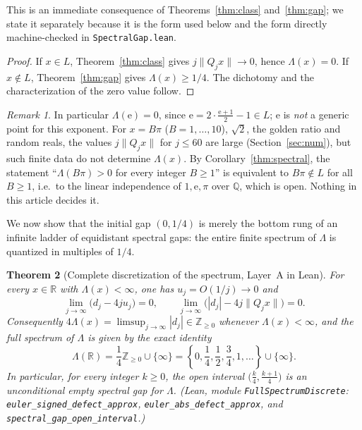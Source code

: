 \documentclass[11pt]{article}
\newtheorem{theorem}{Theorem}
\theoremstyle{definition}
\theoremstyle{remark}
\newtheorem{remark}[theorem]{Remark}
\newcommand{\R}{\mathbb{R}}
\newcommand{\Z}{\mathbb{Z}}
\newcommand{\Q}{\mathbb{Q}}
\newcommand{\ee}{\mathrm{e}}
\newcommand{\Lam}{\Lambda}
\begin{document}
This is an immediate consequence of Theorems~\ref{thm:class}
and~\ref{thm:gap}; we state it separately because it is the form used
below and the form directly machine-checked in \texttt{SpectralGap.lean}.

\begin{proof}
If $x\in L$, Theorem~\ref{thm:class} gives $j\|Q_jx\|\to0$, hence $\Lam(x)=0$.
If $x\notin L$, Theorem~\ref{thm:gap} gives $\Lam(x)\ge1/4$. The dichotomy and
the characterization of the zero value follow.
\end{proof}

\begin{remark}\label{rem:linear-indep}
In particular $\Lam(\ee)=0$, since $\ee=2\cdot\frac{\ee+1}{2}-1\in L$; $\ee$ is
\emph{not} a generic point for this exponent. For $x=B\pi$ ($B=1,\dots,10$),
$\sqrt2$, the golden ratio and random reals, the values $j\|Q_jx\|$ for
$j\le60$ are large (Section~\ref{sec:num}), but such finite data do not
determine $\Lam(x)$. By Corollary~\ref{thm:spectral}, the statement
``$\Lam(B\pi)>0$ for every integer $B\ge1$'' is equivalent to
$B\pi\notin L$ for all $B\ge1$, i.e.\ to the linear independence of
$1,\ee,\pi$ over $\Q$, which is open. Nothing in this article decides it.
\end{remark}

We now show that the initial gap $(0,1/4)$ is merely the bottom rung of an
infinite ladder of equidistant spectral gaps: the entire finite spectrum of
$\Lam$ is quantized in multiples of $1/4$.

\begin{theorem}[Complete discretization of the spectrum, Layer~A in Lean]\label{thm:full-spectrum}
For every $x\in\R$ with $\Lam(x)<\infty$, one has $u_j=O(1/j)\to0$ and
\begin{equation}\label{eq:digit-asymp}
\lim_{j\to\infty}\bigl(d_j-4ju_j\bigr)=0,\qquad
\lim_{j\to\infty}\bigl(|d_j|-4j\|Q_jx\|\bigr)=0.
\end{equation}
Consequently $4\Lam(x)=\limsup_{j\to\infty}|d_j|\in\Z_{\ge0}$ whenever
$\Lam(x)<\infty$, and the full spectrum of $\Lam$ is given by the exact identity
\begin{equation}\label{eq:full-spectrum}
\Lam(\R)=\frac14\Z_{\ge0}\cup\{\infty\}
=\left\{0,\frac14,\frac12,\frac34,1,\dots\right\}\cup\{\infty\}.
\end{equation}
In particular, for every integer $k\ge0$, the open interval
$\bigl(\frac{k}{4},\frac{k+1}{4}\bigr)$ is an unconditional empty spectral gap
for $\Lam$.
(Lean, module \texttt{FullSpectrumDiscrete}:
\texttt{euler\_\allowbreak signed\_\allowbreak defect\_\allowbreak approx},
\texttt{euler\_\allowbreak abs\_\allowbreak defect\_\allowbreak approx}, and
\texttt{spectral\_\allowbreak gap\_\allowbreak open\_\allowbreak interval}.)
\end{theorem}
\end{document}
